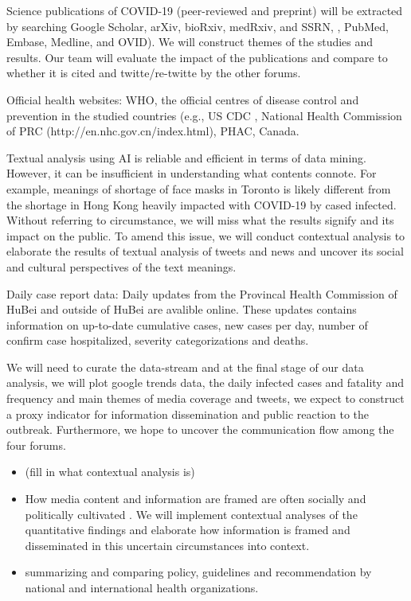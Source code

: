 Science publications of COVID-19 (peer-reviewed and preprint) will be extracted by searching Google Scholar, arXiv, bioRxiv, medRxiv, and SSRN, , PubMed, Embase, Medline, and OVID).  We will construct themes of the studies and results.  Our team will evaluate the impact of the publications and compare to whether it is cited and twitte/re-twitte by the other forums.  

 Official health websites:  WHO, the official centres of disease control and prevention in the studied countries (e.g., US CDC , National Health Commission of PRC (http://en.nhc.gov.cn/index.html), PHAC, Canada. 
 
Textual analysis using AI is reliable and efficient in terms of data mining.  However, it can be insufficient in understanding what contents connote.  For example, meanings of shortage of face masks in Toronto is likely different from the shortage in Hong Kong heavily impacted with COVID-19 by cased infected.  Without referring to circumstance, we will miss what the results signify and its impact on the public.  To amend this issue, we will conduct contextual analysis \citep{} to elaborate the results of textual analysis of tweets and news and uncover its social and cultural perspectives of the text meanings.

Daily case report data: Daily updates from the Provincal Health Commission of HuBei and outside of HuBei are avalible online. These updates contains information on up-to-date cumulative cases, new cases per day, number of confirm case hospitalized, severity categorizations and deaths.


We will need to curate the data-stream and at the final stage of our data analysis,  we will plot google trends data, the daily infected cases and fatality and frequency and main themes of media coverage and tweets,  we expect to construct a proxy indicator for information dissemination and public reaction to the outbreak.  Furthermore, we hope to uncover the communication flow among the four forums.


\begin{itemize}
\item{(fill in what contextual analysis is)}
\item{How media content and information are framed are often socially and politically cultivated \citep{}. We will implement contextual analyses of the quantitative findings and elaborate how information is framed and disseminated in this uncertain circumstances into context.}
\item{summarizing and comparing policy, guidelines and recommendation by national and international health organizations.}
\end{itemize}

